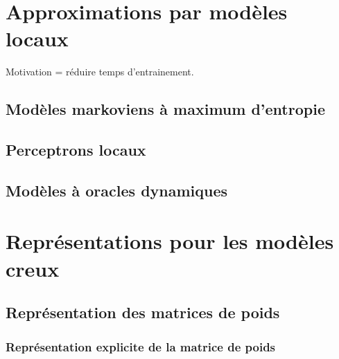 \documentclass[11pt,openany]{book}
\begin{document}
\chapter{Approximations par modèles locaux}

Motivation = réduire temps d'entrainement.

\section{Modèles markoviens à maximum d'entropie}
\section{Perceptrons locaux}
\section{Modèles à oracles dynamiques}


\appendix
\chapter{Représentations pour les modèles creux}
\section{Représentation des matrices de poids}

\subsection{Représentation explicite de la matrice de poids}
\end{document}
